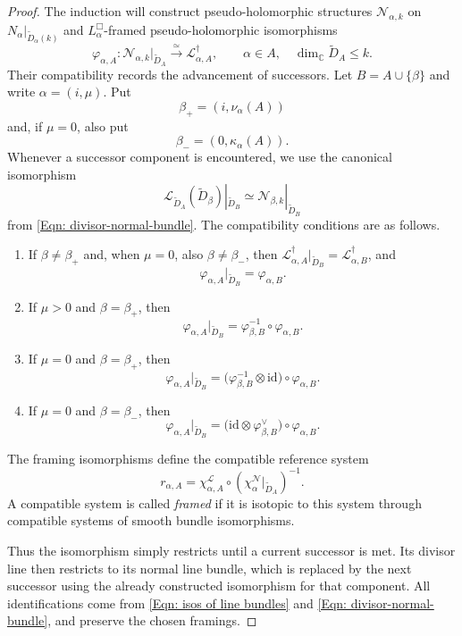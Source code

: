 \documentclass[11pt]{amsart}
\numberwithin{equation}{section}
\theoremstyle{plain}
\theoremstyle{definition}
\newcommand{\CC}{\mathbb{C}}
\newcommand{\scrL}{\mathscr{L}}
\newcommand{\scrN}{\mathscr{N}}
\begin{document}
\begin{proof}
The induction will construct pseudo-holomorphic structures $\scrN_{\alpha,k}$ on
$N_\alpha|_{\widetilde D_\alpha(k)}$ and  $L_\alpha^\Box$-framed
pseudo-holomorphic isomorphisms
\begin{equation}
\label{Eqn: phi alpha A}
\varphi_{\alpha,A}:
\scrN_{\alpha,k}|_{\widetilde D_A}
\xrightarrow{\;\simeq\;}
\scrL^\dagger_{\alpha,A},
\qquad \alpha\in A,\quad \dim_\CC\widetilde D_A\le k.
\end{equation}
Their compatibility records the advancement of successors. Let
$B=A\cup\{\beta\}$ and write $\alpha=(i,\mu)$. Put
\[
\beta_+=(i,\nu_\alpha(A))
\]
and, if $\mu=0$, also put
\[
\beta_-=(0,\kappa_\alpha(A)).
\]
Whenever a successor component is encountered, we use the canonical
isomorphism
\[
\scrL_{\widetilde D_A}(\widetilde D_\beta)|_{\widetilde D_B}
\simeq
\scrN_{\beta,k}|_{\widetilde D_B}
\]
from \eqref{Eqn: divisor-normal-bundle}. The compatibility conditions are as
follows.
\begin{enumerate}
\item
If $\beta\ne\beta_+$ and, when $\mu=0$, also $\beta\ne\beta_-$, then
$\scrL^\dagger_{\alpha,A}|_{\widetilde D_B}
=\scrL^\dagger_{\alpha,B}$, and
\[
\varphi_{\alpha,A}|_{\widetilde D_B}
=
\varphi_{\alpha,B}.
\]
\item
If $\mu>0$ and $\beta=\beta_+$, then
\[
\varphi_{\alpha,A}|_{\widetilde D_B}
=
\varphi_{\beta,B}^{-1}\circ\varphi_{\alpha,B}.
\]
\item
If $\mu=0$ and $\beta=\beta_+$, then
\[
\varphi_{\alpha,A}|_{\widetilde D_B}
=
\bigl(\varphi_{\beta,B}^{-1}\otimes\mathrm{id}\bigr)
\circ\varphi_{\alpha,B}.
\]
\item
If $\mu=0$ and $\beta=\beta_-$, then
\[
\varphi_{\alpha,A}|_{\widetilde D_B}
=
\bigl(\mathrm{id}\otimes\varphi_{\beta,B}^{\vee}\bigr)
\circ\varphi_{\alpha,B}.
\]
\end{enumerate}
The framing isomorphisms define the compatible reference system
\[
r_{\alpha,A}=\chi^\scrL_{\alpha,A}\circ
(\chi^\scrN_\alpha|_{\widetilde D_A})^{-1}.
\]
A compatible system is called \emph{framed} if it is isotopic to this system
through compatible systems of smooth bundle isomorphisms.

Thus the isomorphism simply restricts until a current successor is met. Its
divisor line then restricts to its normal line bundle, which is replaced by the
next successor using the already constructed isomorphism for that component. All
identifications come from \eqref{Eqn: isos of line bundles} and \eqref{Eqn:
divisor-normal-bundle}, and preserve the chosen framings.


\end{proof}
\end{document}
